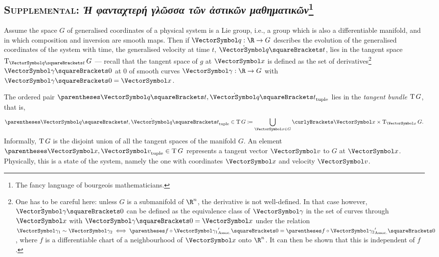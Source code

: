 \documentclass[10pt, a4paper, twoside]{lecturenotes}
\newcommand{\Rn}{{\R^n}}
\begin{document}
\begin{supplemental}
\subsection{\textsc{Supplemental: }\emph{\textgreek{Ἡ φανταχτερή γλῶσσα τῶν ἀστικῶν μαθηματικῶν}}\footnote{The fancy language of bourgeois mathematicians.}}
\begingroup
\newcommand{\VelocitySpace}{\LieAlgebraSymbol{g}}
\newcommand{\MomentumSpace}{\Dual\VelocitySpace}
\newcommand{\Lagrangian}{\mathscr{L}}
\newcommand{\Hamiltonian}{\mathscr{H}}
\newcommand{\eqrel}{\sim}
Assume the space $G$ of generalised coordinates of a physical system is a Lie group, i.e., a group which is also a differentiable manifold, and in which composition and inversion are smooth maps. Then if $\FunctionSpec\vq \R G$ describes the evolution of the generalised coordinates of the system with time, the generalised velocity at time $t$, $\TimeDerivative\vq\of t$, lies in the tangent space $\TangentSpace{\vq\of t}G$ --- recall that the tangent space of $g$ at $\vx$ is defined as the set of derivatives\footnote{One has to be careful here: unless $G$ is a submanifold of $\Rn$, the derivative is not well-defined. In that case however, $\TimeDerivative \vgg\of 0$ can be defined as the equivalence class of $\vgg$ in the set of curves through $\vx$ with $\vgg\of 0 = \vx$ under the relation $\vgg_1\eqrel\vgg_2 \Equivalent \pa{f\Compose\vgg_1}\der\of 0 = \pa{f\Compose\vgg_2}\der\of 0$, where $f$ is a differentiable chart of a neighbourhood of $\vx$ onto $\Rn$. It can then be shown that this is independent of $f$.} $\TimeDerivative \vgg\of 0$ at $0$ of smooth curves $\FunctionSpec\vgg\R G$ with $\vgg\of 0 = \vx$.

The ordered pair $\tuple{\vq\of t,\TimeDerivative\vq\of t}$ lies in the \emph{tangent bundle} $\operatorname{T}{G}$, that is,
\begin{equation*}
\tuple{\vq\of t,\TimeDerivative\vq\of t} \in \TangentBundle G \DefineAs \UnionOver{\vx \in G} \set{\vx} \Cartesian \TangentSpace{\vx}G\text{.}
\end{equation*}
Informally, $\operatorname{T}{G}$ is the disjoint union of all the tangent spaces of the manifold $G$. An element $\tuple{\vx,\vv}\in \TangentBundle G$  represents a tangent vector $\vv$ to $G$ at $\vx$. Physically, this is a state of the system, namely the one with coordinates $\vx$ and velocity $\vv$. 


\end{supplemental}
\end{document}
